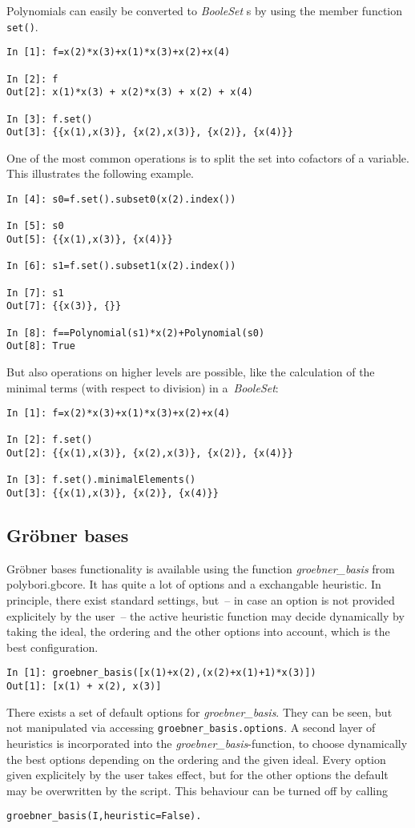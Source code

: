 \documentclass[]{article}
\newcommand{\Groebner}{Gröbner\xspace}
\newcommand{\functionname}[1]{\textit{#1}\xspace}
\begin{document}
Polynomials can easily be converted to \functionname{BooleSet}s by using the
member function \verb|set()|.
\begin{verbatim}
In [1]: f=x(2)*x(3)+x(1)*x(3)+x(2)+x(4)

In [2]: f
Out[2]: x(1)*x(3) + x(2)*x(3) + x(2) + x(4)

In [3]: f.set()
Out[3]: {{x(1),x(3)}, {x(2),x(3)}, {x(2)}, {x(4)}}
\end{verbatim}
%
One of the most common operations is to split the set into cofactors of a
variable. This illustrates the following example.
%
\begin{verbatim}
In [4]: s0=f.set().subset0(x(2).index())

In [5]: s0
Out[5]: {{x(1),x(3)}, {x(4)}}

In [6]: s1=f.set().subset1(x(2).index())

In [7]: s1
Out[7]: {{x(3)}, {}}

In [8]: f==Polynomial(s1)*x(2)+Polynomial(s0)
Out[8]: True
\end{verbatim}
%
But also operations on higher levels are possible, like the calculation of the minimal terms (with respect to division) in a~\functionname{BooleSet}:
\begin{verbatim}
In [1]: f=x(2)*x(3)+x(1)*x(3)+x(2)+x(4)

In [2]: f.set()
Out[2]: {{x(1),x(3)}, {x(2),x(3)}, {x(2)}, {x(4)}}

In [3]: f.set().minimalElements()
Out[3]: {{x(1),x(3)}, {x(2)}, {x(4)}}
\end{verbatim}
\subsection{\Groebner bases}
\Groebner bases functionality is available using the function \functionname{groebner\_basis} from polybori.gbcore.
It has quite a lot of options and a exchangable heuristic.
In principle, there exist  standard settings, but~-- in case an option is not
provided explicitely by the user~-- the active heuristic function
may decide dynamically by taking the ideal, the ordering and the other options into account, which is the best configuration.
\begin{verbatim}
In [1]: groebner_basis([x(1)+x(2),(x(2)+x(1)+1)*x(3)])
Out[1]: [x(1) + x(2), x(3)]
\end{verbatim}

There exists a set of default options for \functionname{groebner\_basis}.
They can be seen, but not manipulated via accessing \verb|groebner_basis.options|.
A second layer of heuristics is incorporated into the \functionname{groebner\_basis}-function, to choose dynamically the best options depending on the ordering and the given ideal.
Every option given explicitely by the user takes effect, but for the other options the default may be overwritten by the script.
This behaviour can be turned off by calling
\begin{verbatim}
groebner_basis(I,heuristic=False).
\end{verbatim}
\end{document}
